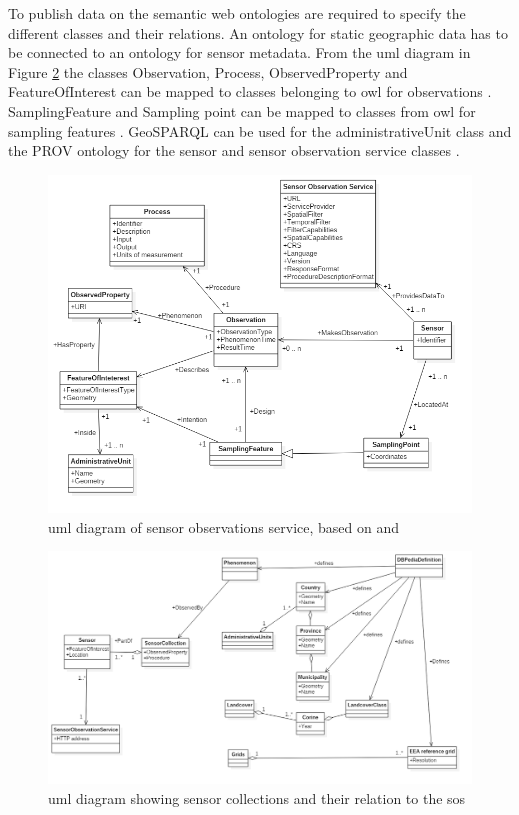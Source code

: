 To publish data on the semantic web ontologies are required to specify the different classes and their relations. An ontology for static geographic data has to be connected to an ontology for sensor metadata. From the \ac{uml} diagram in Figure \ref{fig:UML} the classes Observation, Process, ObservedProperty and FeatureOfInterest can be mapped to classes belonging to \ac{owl} for observations \citep{SSW:Cox}. SamplingFeature and Sampling point can be mapped to classes from \ac{owl} for sampling features \citep{SSW:Cox2}. GeoSPARQL can be used for the administrativeUnit class \citep{LD:OGC} and the PROV ontology for the sensor and sensor observation service classes \citep{LD:W3C2}. 

\begin{figure}
	\centering
	\includegraphics[width=1\linewidth]{UML/UML_Diagram.png}
	\caption{\ac{uml} diagram of sensor observations service, based on \cite{SSW:Cox3} and \cite{SDI:INSPIRE2}}
	\label{fig:UML}
\end{figure}

\begin{figure}
	\centering
	\includegraphics[width=1\linewidth]{UML/SensorLinks3.png}
	\caption{\ac{uml} diagram showing sensor collections and their relation to the \ac{sos}}
	\label{fig:UML}
\end{figure}

